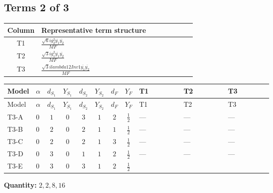 \documentclass[8pt]{article}
\begin{document}
\begin{landscape}
\subsection*{Terms 2 of 3}
\begin{center}
\begin{tabular}{@{}c >{\raggedright\arraybackslash}p{0.82\linewidth}@{}}
\toprule
Column & Representative term structure \\
\midrule
T1 & \(\displaystyle \frac{\sqrt{6} i g_{2}^{2} \overline{y_{1}} \overline{y_{2}}}{MF}\) \\
\midrule
T2 & \(\displaystyle \frac{\sqrt{3} i g_{1}^{2} \overline{y_{1}} \overline{y_{2}}}{MF}\) \\
\midrule
T3 & \(\displaystyle \frac{\sqrt{3} i lambda12Inv1 \overline{y_{1}} \overline{y_{2}}}{MF}\) \\
\midrule
\bottomrule
\end{tabular}
\end{center}
\smallskip
\tiny
\begin{longtable}{@{}llcccccc >{\raggedright\arraybackslash}p{0.21\linewidth} >{\raggedright\arraybackslash}p{0.21\linewidth} >{\raggedright\arraybackslash}p{0.21\linewidth}@{}}
\toprule
Model & $\alpha$ & $d_{S_1}$ & $Y_{S_1}$ & $d_{S_2}$ & $Y_{S_2}$ & $d_F$ & $Y_F$ & T1 & T2 & T3 \\
\midrule
\endfirsthead
\toprule
Model & $\alpha$ & $d_{S_1}$ & $Y_{S_1}$ & $d_{S_2}$ & $Y_{S_2}$ & $d_F$ & $Y_F$ & T1 & T2 & T3 \\
\midrule
\endhead
T3-A & $0$ & $1$ & $0$ & $3$ & $1$ & $2$ & $\frac{1}{2}$ & --- & --- & --- \\
\midrule
T3-B & $0$ & $2$ & $0$ & $2$ & $1$ & $1$ & $\frac{1}{2}$ & --- & --- & --- \\
\midrule
T3-C & $0$ & $2$ & $0$ & $2$ & $1$ & $3$ & $\frac{1}{2}$ & --- & --- & --- \\
\midrule
T3-D & $0$ & $3$ & $0$ & $1$ & $1$ & $2$ & $\frac{1}{2}$ & --- & --- & --- \\
\midrule
T3-E & $0$ & $3$ & $0$ & $3$ & $1$ & $2$ & $\frac{1}{2}$ & \scriptsize\adjustbox{max width=\linewidth}{$\begin{gathered} - \frac{\sqrt{6} i g_{2}^{2} \overline{y_{1}} \overline{y_{2}}}{3 MF}\end{gathered}$} & \scriptsize\adjustbox{max width=\linewidth}{$\begin{gathered} - \frac{\sqrt{3} i g_{1}^{2} \overline{y_{1}} \overline{y_{2}}}{8 MF}\end{gathered}$} & \scriptsize\adjustbox{max width=\linewidth}{$\begin{gathered} \frac{\sqrt{3} i lambda12Inv1 \overline{y_{1}} \overline{y_{2}}}{6 MF}\end{gathered}$} \\
\midrule
\bottomrule
\end{longtable}
\clearpage
\noindent\textbf{Quantity: }$\mathrm{2,2,8,16}$\par\smallskip

\end{landscape}
\end{document}
